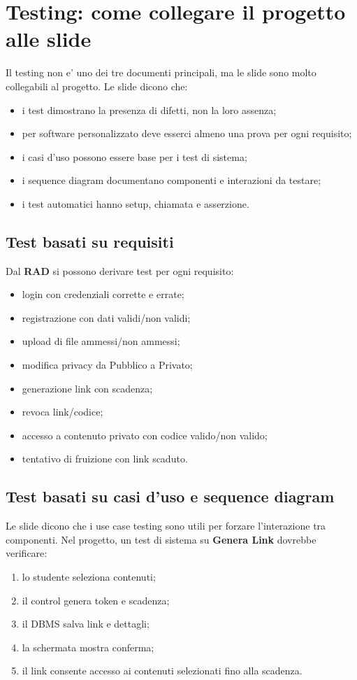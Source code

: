 ﻿\documentclass[11pt,a4paper]{article}
\newcommand{\doc}[1]{\textbf{#1}}
\newcommand{\term}[1]{\textbf{#1}}
\begin{document}
\section{Testing: come collegare il progetto alle slide}

Il testing non e' uno dei tre documenti principali, ma le slide sono molto collegabili al
progetto. Le slide dicono che:
\begin{itemize}
  \item i test dimostrano la presenza di difetti, non la loro assenza;
  \item per software personalizzato deve esserci almeno una prova per ogni requisito;
  \item i casi d'uso possono essere base per i test di sistema;
  \item i sequence diagram documentano componenti e interazioni da testare;
  \item i test automatici hanno setup, chiamata e asserzione.
\end{itemize}

\subsection{Test basati su requisiti}

Dal \doc{RAD} si possono derivare test per ogni requisito:
\begin{itemize}
  \item login con credenziali corrette e errate;
  \item registrazione con dati validi/non validi;
  \item upload di file ammessi/non ammessi;
  \item modifica privacy da Pubblico a Privato;
  \item generazione link con scadenza;
  \item revoca link/codice;
  \item accesso a contenuto privato con codice valido/non valido;
  \item tentativo di fruizione con link scaduto.
\end{itemize}

\subsection{Test basati su casi d'uso e sequence diagram}

Le slide dicono che i use case testing sono utili per forzare l'interazione tra componenti.
Nel progetto, un test di sistema su \term{Genera Link} dovrebbe verificare:
\begin{enumerate}
  \item lo studente seleziona contenuti;
  \item il control genera token e scadenza;
  \item il DBMS salva link e dettagli;
  \item la schermata mostra conferma;
  \item il link consente accesso ai contenuti selezionati fino alla scadenza.
\end{enumerate}
\end{document}
